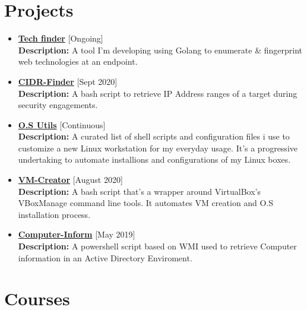 \documentclass[11pt,a4paper]{moderncv}
\begin{document}
\section{Projects}

\begin{itemize}	

	\item\textbf{\href{https://github.com/BabyBabaBabu/tech-finder}{Tech finder}}  \hfill [Ongoing]\\
	\textbf{Description:}
A tool I'm developing using Golang to enumerate \& fingerprint web technologies at an endpoint.

	\item\textbf{\href{https://github.com/BabyBabaBabu/cidr-finder}{CIDR-Finder}} \hfill [Sept 2020]\\
	\textbf{Description:}
A bash script to retrieve IP Address ranges of a target during security engagements.
	
	\item\textbf{\href{https://github.com/BabyBabaBabu/tweaks}{O.S Utils}} \hfill [Continuous]\\
	\textbf{Description:}
A curated list of shell scripts and configuration files i use to customize a new Linux workstation for my everyday usage. It's a progressive undertaking to automate installions and configurations of my Linux boxes.

	\item\textbf{{\href{https://github.com/BabyBabaBabu/vm-creator}{VM-Creator}}} \hfill[August 2020]\\
	\textbf{Description:}
A bash script that's a wrapper around VirtualBox's VBoxManage command line tools. It automates VM creation and O.S installation process.

	\item\textbf{\href{https://github.com/BabyBabaBabu/computer-inform}{Computer-Inform}} \hfill[May 2019]\\
	\textbf{Description:}
	A powershell script based on WMI used to retrieve Computer information in an Active Directory Enviroment.

\end{itemize}

\section{Courses}
\end{document}

